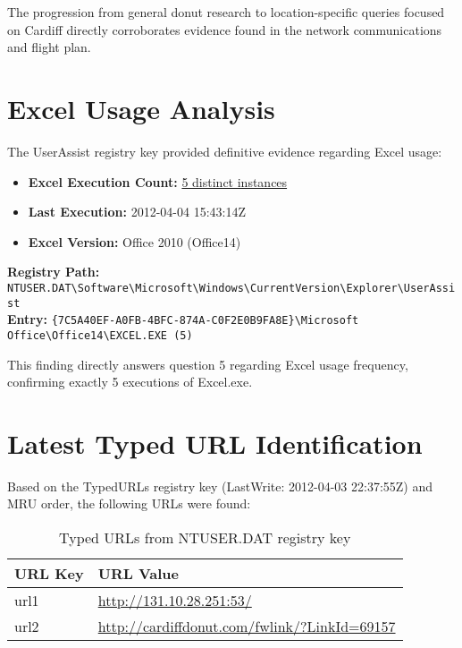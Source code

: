 The progression from general donut research to location-specific queries focused on Cardiff directly corroborates evidence found in the network communications and flight plan.

\section{Excel Usage Analysis}
The UserAssist registry key provided definitive evidence regarding Excel usage:

\begin{itemize}
    \item \textbf{Excel Execution Count:} \underline{5 distinct instances}
    \item \textbf{Last Execution:} 2012-04-04 15:43:14Z
    \item \textbf{Excel Version:} Office 2010 (Office14)
\end{itemize}

\textbf{Registry Path:} \texttt{NTUSER.DAT\textbackslash Software\textbackslash Microsoft\textbackslash Windows\textbackslash CurrentVersion\textbackslash Explorer\textbackslash UserAssist}\\
\textbf{Entry:} \texttt{\{7C5A40EF-A0FB-4BFC-874A-C0F2E0B9FA8E\}\textbackslash Microsoft Office\textbackslash Office14\textbackslash EXCEL.EXE (5)}

This finding directly answers question 5 regarding Excel usage frequency, confirming exactly 5 executions of Excel.exe.

\section{Latest Typed URL Identification}
Based on the TypedURLs registry key (LastWrite: 2012-04-03 22:37:55Z) and MRU order, the following URLs were found:

\begin{table}[htbp]
    \centering
    \begin{tabular}{|l|p{11cm}|}
        \hline
        \textbf{URL Key} & \textbf{URL Value} \\
        \hline
        url1 & \url{http://131.10.28.251:53/} \\
        \hline
        url2 & \url{http://cardiffdonut.com/fwlink/?LinkId=69157} \\
        \hline
    \end{tabular}
    \caption{Typed URLs from NTUSER.DAT registry key}
    \label{tab:typed_urls}
\end{table}

